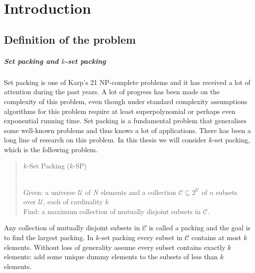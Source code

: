 \chapter{Introduction}\label{chap:Introduction}


\section{Definition of the problem}\label{sec:Problem}

\paragraph{Set packing and $k$-set packing} Set packing is one of Karp's 21 NP-complete problems \cite{Karp} and it has received a lot of attention during the past years. A lot of progress has been made on the complexity of this problem, even though under standard complexity assumptions algorithms for this problem require at least superpolynomial or perhaps even exponential running time. Set packing is a fundamental problem that generalises some well-known problems and thus knows a lot of applications. There has been a long line of research on this problem. In this thesis we will consider $k$-set packing, which is the following problem.
%
\begin{quote}
\begin{bf}$k$-Set Packing ($k$-SP)\end{bf}\\
Given: a universe $\mathcal{U}$ of $N$ elements and a collection $\mathcal{C} \subseteq 2^\mathcal{U}$ of $n$ subsets over $\mathcal{U}$, each of cardinality $k$ \\
Find: a maximum collection of mutually disjoint subsets in $\mathcal{C}$.
\end{quote}
%
Any collection of mutually disjoint subsets in $\mathcal{C}$ is called a packing and the goal is to find the largest packing. In $k$-set packing every subset in $\mathcal{C}$ contains at most $k$ elements. Without loss of generality assume every subset contains exactly $k$ elements: add some unique dummy elements to the subsets of less than $k$ elements.

